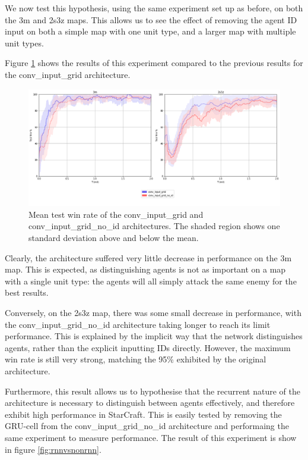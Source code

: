We now test this hypothesis, using the same experiment set up as before, on both the 3m and 2s3z maps. This allows us to see the effect of removing the agent ID input on both a simple map with one unit type, and a larger map with multiple unit types.

Figure \ref{fig:noid} shows the results of this experiment compared to the previous results for the conv\_input\_grid architecture.

\begin{figure}
    \centering
    \hbox{\hspace{-6.6em}\includegraphics[scale=0.47]{images/graphs/noid.png}}
    \caption{Mean test win rate of the conv\_input\_grid and conv\_input\_grid\_no\_id architectures. The shaded region shows one standard deviation above and below the mean.}
    \label{fig:noid}
\end{figure}


Clearly, the architecture suffered very little decrease in performance on the 3m map. This is expected, as distinguishing agents is not as important on a map with a single unit type: the agents will all simply attack the same enemy for the best results.

Conversely, on the 2s3z map, there was some small decrease in performance, with the conv\_input\_grid\_no\_id architecture taking longer to reach its limit performance. This is explained by the implicit way that the network distinguishes agents, rather than the explicit inputting IDs directly. However, the maximum win rate is still very strong, matching the 95\% exhibited by the original architecture. 


Furthermore, this result allows us to hypothesise that the recurrent nature of the architecture is necessary to distinguish between agents effectively, and therefore exhibit high performance in StarCraft. This is easily tested by removing the GRU-cell from the conv\_input\_grid\_no\_id architecture and performaing the same experiment to measure performance. The result of this experiment is show in figure \ref{fig:rnnvsnonrnn}.

